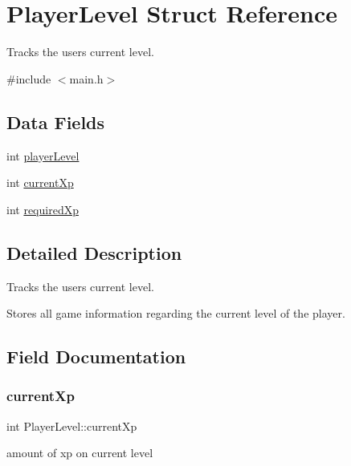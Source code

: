 \hypertarget{struct_player_level}{}\section{Player\+Level Struct Reference}
\label{struct_player_level}


Tracks the user\textquotesingle{}s current level.  




{\ttfamily \#include $<$main.\+h$>$}

\subsection*{Data Fields}
\begin{DoxyCompactItemize}
\item 
int \hyperlink{struct_player_level_abaeb25b74813d25693446f1966c92155}{player\+Level}
\item 
int \hyperlink{struct_player_level_a9b8f1dd67cbce5b4191e0506dea61c12}{current\+Xp}
\item 
int \hyperlink{struct_player_level_aca49ddf51125224bb80fd9f9dbef376b}{required\+Xp}
\end{DoxyCompactItemize}


\subsection{Detailed Description}
Tracks the user\textquotesingle{}s current level. 

Stores all game information regarding the current level of the player. 

\subsection{Field Documentation}
\mbox{\label{struct_player_level_a9b8f1dd67cbce5b4191e0506dea61c12}} 
\subsubsection{\texorpdfstring{current\+Xp}{currentXp}}
{\footnotesize\ttfamily int Player\+Level\+::current\+Xp}

amount of xp on current level \mbox{\label{struct_player_level_abaeb25b74813d25693446f1966c92155}} 
